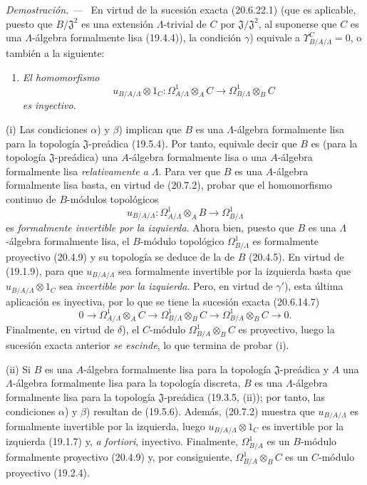 \documentclass[10pt,oneside]{book}
\newcommand{\oldpage}[2][]{%
  \setcounter{footnote}{0}%
  \marginpar{\scriptsize\textbf{#1}~|~#2}\ignorespaces}
\newenvironment{proof}{%
  \par\medskip\noindent\textit{Demostración. ---\ }}{\par}
\begin{document}
\begin{proof}
En virtud de la sucesión exacta (20.6.22.1) (que es aplicable, puesto que
$B/\mathfrak J^2$ es una extensión $\Lambda$-trivial de $C$ por
$\mathfrak J/\mathfrak J^2$, al suponerse que $C$ es una $\Lambda$-álgebra
formalmente lisa (19.4.4)), la condición $\gamma$) equivale a
$\Upsilon^C_{B/A/\Lambda}=0$, o también a la siguiente:
\begin{enumerate}
  \item[$\gamma'$)] \emph{El homomorfismo}
  \[
    u_{B/A/\Lambda}\otimes 1_C:
    \Omega^1_{A/\Lambda}\otimes_A C
    \longrightarrow \Omega^1_{B/\Lambda}\otimes_B C
  \]
  \emph{es inyectivo}.
\end{enumerate}

(i) Las condiciones $\alpha$) y $\beta$) implican que $B$ es una
$\Lambda$-álgebra formalmente lisa para la topología
$\mathfrak J$-preádica (19.5.4). Por tanto, equivale decir que $B$ es (para la
topología $\mathfrak J$-preádica) una $A$-álgebra formalmente lisa o una
$A$-álgebra formalmente lisa \emph{relativamente a $\Lambda$}. Para ver que
$B$ es una $A$-álgebra formalmente lisa basta, en virtud de (20.7.2), probar
que el homomorfismo continuo de $B$-módulos topológicos
\[
  u_{B/A/\Lambda}:\Omega^1_{A/\Lambda}\otimes_A B
  \longrightarrow\Omega^1_{B/\Lambda}
\]
es \emph{formalmente invertible por la izquierda}. Ahora bien, puesto que $B$
es una $\Lambda$-álgebra formalmente lisa, el $B$-módulo topológico
$\Omega^1_{B/\Lambda}$ es formalmente proyectivo (20.4.9) y su topología se
deduce de la de $B$ (20.4.5). En virtud de (19.1.9), para que
$u_{B/A/\Lambda}$ sea formalmente invertible por la izquierda basta que
$u_{B/A/\Lambda}\otimes 1_C$ sea \emph{invertible por la izquierda}. Pero, en virtud
de $\gamma'$), esta última aplicación es inyectiva, por lo que se tiene la
sucesión exacta (20.6.14.7)
\[
  0\longrightarrow\Omega^1_{A/\Lambda}\otimes_A C
  \longrightarrow\Omega^1_{B/\Lambda}\otimes_B C
  \longrightarrow\Omega^1_{B/A}\otimes_B C\longrightarrow0.
\]
Finalmente, en virtud de $\delta$), el $C$-módulo
$\Omega^1_{B/A}\otimes_BC$ es proyectivo, luego la sucesión exacta anterior
\emph{se escinde}, lo que termina de probar (i).

\oldpage[0\textsubscript{IV-1}]{184}

(ii) Si $B$ es una $A$-álgebra formalmente lisa para la topología
$\mathfrak J$-preádica y $A$ una $\Lambda$-álgebra formalmente lisa para la
topología discreta, $B$ es una $\Lambda$-álgebra formalmente lisa para la topología
$\mathfrak J$-preádica (19.3.5, (ii)); por tanto, las condiciones $\alpha$) y
$\beta$) resultan de (19.5.6). Además, (20.7.2) muestra que
$u_{B/A/\Lambda}$ es formalmente invertible por la izquierda, luego
$u_{B/A/\Lambda}\otimes 1_C$ es invertible por la izquierda (19.1.7) y, \emph{a
fortiori}, inyectivo. Finalmente, $\Omega^1_{B/A}$ es un $B$-módulo
formalmente proyectivo (20.4.9) y, por consiguiente,
$\Omega^1_{B/A}\otimes_BC$ es un $C$-módulo proyectivo (19.2.4).
\end{proof}
\end{document}
